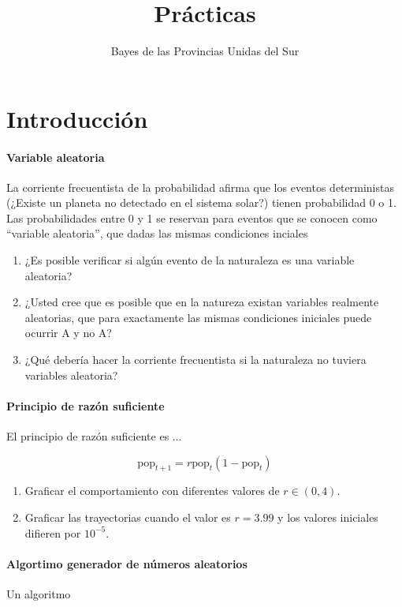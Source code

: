 \documentclass[a4paper,10pt]{article}
\title{Prácticas}
\author{Bayes de las Provincias Unidas del Sur}
\begin{document}
\maketitle

\tableofcontents

\section{Introducción}


\paragraph{Variable aleatoria} La corriente frecuentista de la probabilidad afirma que los eventos deterministas (¿Existe un planeta no detectado en el sistema solar?) tienen probabilidad 0 o 1.
Las probabilidades entre 0 y 1 se reservan para eventos que se conocen como ``variable aleatoria'', que dadas las mismas condiciones inciales 

\begin{enumerate}[resume]
\item ¿Es posible verificar si algún evento de la naturaleza es una variable aleatoria?
\item ¿Usted cree que es posible que en la natureza existan variables realmente aleatorias, que para exactamente las mismas condiciones iniciales puede ocurrir A y no A?
\item ¿Qué debería hacer la corriente frecuentista si la naturaleza no tuviera variables aleatoria? 
\end{enumerate}

\paragraph{Principio de razón suficiente} El principio de razón suficiente es ... 

\begin{equation}
\text{pop}_{t+1} = r \text{pop}_t (1-\text{pop}_t)
\end{equation}

\begin{enumerate}[resume]
\item Graficar el comportamiento con diferentes valores de $r \in (0,4)$.
\item Graficar las trayectorias cuando el valor es $r=3.99$ y los valores iniciales difieren por $10^{-5}$.
\end{enumerate}

\paragraph{Algortimo generador de números aleatorios} Un algoritmo 
\end{document}
